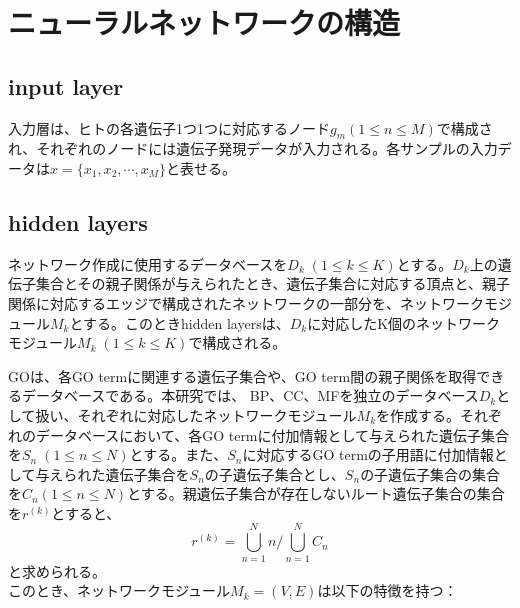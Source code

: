 \documentclass[a4paper,12pt]{jsreport}
\begin{document}
\section{ニューラルネットワークの構造}
\begin{comment}
\#\#\#\#\#\#\#\#\#\#\# \\
input layer、hidden layer、output layerについて全体と図\\
input layerについて\\
hidden layerについて(GO・ractomeとMSigDBのモジュール設計手法)\\
ノードの数の決め方、エッジの計算方法、tanhとbatchnorm\\
output layerについて\\
\#\#\#\#\#\#\#\#\#\#\# \\
\end{comment}


\subsection{input layer}
入力層は、ヒトの各遺伝子1つ1つに対応するノード$g_m(1\leq n\leq M)$で構成され、それぞれのノードには遺伝子発現データが入力される。各サンプルの入力データは$x = \{x_1, x_2, \cdots, x_M\}$と表せる。


\subsection{hidden layers}
ネットワーク作成に使用するデータベースを$D_k \; (1\leq k\leq K)$とする。$D_k$上の遺伝子集合とその親子関係が与えられたとき、遺伝子集合に対応する頂点と、親子関係に対応するエッジで構成されたネットワークの一部分を、ネットワークモジュール$M_k$とする。このときhidden layersは、$D_k$に対応したK個のネットワークモジュール$M_k \; (1\leq k\leq K)$で構成される。


GOは、各GO termに関連する遺伝子集合や、GO term間の親子関係を取得できるデータベースである。本研究では、 BP、CC、MFを独立のデータベース$D_k$として扱い、それぞれに対応したネットワークモジュール$M_k$を作成する。それぞれのデータベースにおいて、各GO termに付加情報として与えられた遺伝子集合を$S_n \; (1\leq n\leq N)$とする。また、$S_n$に対応するGO termの子用語に付加情報として与えられた遺伝子集合を$S_n$の子遺伝子集合とし、$S_n$の子遺伝子集合の集合を$C_n(1\leq n\leq N)$とする。親遺伝子集合が存在しないルート遺伝子集合の集合を$r^{(k)}$とすると、$$r^{(k)} = \bigcup_{n = 1}^{N}n / \bigcup_{n = 1}^{N} C_n$$と求められる。\\
このとき、ネットワークモジュール$M_k = (V, E)$は以下の特徴を持つ：
\end{document}
